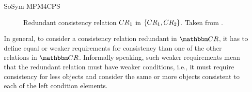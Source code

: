 \begin{copiedFrom}{SoSym MPM4CPS}


\begin{figure}
    \centering
    
    \caption[Redundant consistency relation]{Redundant consistency relation $CR_{1}$ in $\{ CR_{1}, CR_{2} \}$. Taken from .}
    \label{fig:correctness:formal:redundancyrelationextremes}
\end{figure}

In general, to consider a consistency relation redundant in %
$\consistencyrelationset{CR}$, it has to define equal or weaker requirements for consistency than one of the other relations in $\consistencyrelationset{CR}$.
Informally speaking, such weaker requirements mean that the redundant relation must have weaker conditions, i.e., it must require consistency for less objects and consider the same or more objects consistent to each of the left condition elements. %


\end{copiedFrom}

